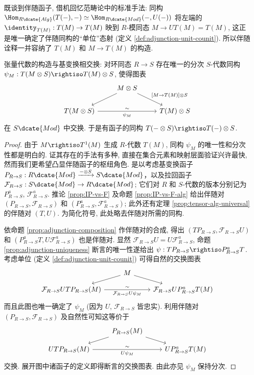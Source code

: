 既谈到伴随函子, 借机回忆范畴论中的标准手法: 同构 $\Hom_{R\dcate{Alg}}(T(-), -) \simeq \Hom_{R\dcate{Mod}}(-, U(-))$ 将左端的 $\identity_{T(M)}: T(M) \to T(M)$ 映到 $R$-模同态 $M \to UT(M) = T(M)$, 这正是唯一确定了伴随同构的``单位''态射 (定义 \ref{def:adjunction-unit-counit}). 所以伴随诠释一并容纳了 $T(M)$ 和 $M \to T(M)$ 的构造.

\begin{lemma}\label{prop:tensor-alg-basechange}
	张量代数的构造与基变换相交换: 对环同态 $R \to S$ 存在唯一的分次 $S$-代数同构 $\psi_M: T(M \otimes S) \rightiso T(M) \otimes S$, 使得图表
	\[\begin{tikzcd}
		& M \otimes S \arrow[ld] \arrow[rd, "{[M \to T(M)] \otimes S}"] & \\
		T(M \otimes S) \arrow[rr, "\sim", "\psi_M"'] & & T(M) \otimes S
	\end{tikzcd}\]
	在 $S\dcate{Mod}$ 中交换. 于是有函子的同构 $T(- \otimes S) \rightiso T(-) \otimes S$.
\end{lemma}
\begin{proof}
	由于 $M \rightiso T^1(M)$ 生成 $R$-代数 $T(M)$, 同构 $\psi_M$ 的唯一性和分次性都是明白的. 证其存在的手法有多种, 直接在集合元素和映射层面验证兴许最快, 然而我们更希望凸显伴随函子的枢纽角色. 是以考虑基变换函子 $P_{R \to S}: R\dcate{Mod} \xrightarrow{- \otimes S} S\dcate{Mod}$，以及拉回函子 $\mathcal{F}_{R \to S}: S\dcate{Mod} \to R\dcate{Mod}$; 它们对 $R$ 和 $S$-代数的版本分别记为 $P_{R \to S}^a$, $\mathcal{F}^a_{R \to S}$. 推论 \ref{prop:IP-vs-F} 及命题 \ref{prop:IP-vs-F-alg} 给出伴随对 $(P_{R \to S}, \mathcal{F}_{R \to S})$ 和 $(P_{R \to S}^a, \mathcal{F}_{R \to S}^a)$; 此外还有定理 \ref{prop:tensor-alg-universal}的伴随对 $(T, U)$. 为简化符号, 此处略去伴随对所需的同构.

	依命题 \ref{prop:adjunction-composition} 作伴随对的合成, 得出 $(T P_{R \to S}, \mathcal{F}_{R \to S} U)$ 和 $(P_{R \to S}^a T, U \mathcal{F}_{R \to S}^a)$ 也是伴随对. 显然 $\mathcal{F}_{R \to S} U = U \mathcal{F}_{R \to S}^a$, 命题 \ref{prop:adjunction-uniqueness} 断言的唯一性遂给出 $\psi: TP_{R \to S} \rightiso P_{R \to S}^a T$. 考虑单位 (定义 \ref{def:adjunction-unit-counit}) 可得自然的交换图表
	\[\begin{tikzcd}[row sep=small]
		{} & M \arrow[ld] \arrow[rd] & \\
		\mathcal{F}_{R \to S} U T P_{R \to S} (M) \arrow[rr, "\sim", "{\mathcal{F}_{R \to S}U \psi_M}"'] & & \mathcal{F}_{R \to S} U P_{R \to S}^a T(M)
	\end{tikzcd}\]
	而且此图也唯一确定了 $\psi_M$ (因为 $U$, $\mathcal{F}_{R \to S}$ 皆忠实). 利用伴随对 $(P_{R \to S}, \mathcal{F}_{R \to S})$ 及自然性可知这等价于
	\[\begin{tikzcd}[row sep=small]
		{} & P_{R \to S}(M) \arrow[ld] \arrow[rd] & \\
		U T P_{R \to S} (M) \arrow[rr, "\sim", "{U \psi_M}"'] & & U P_{R \to S}^a T(M)
	\end{tikzcd}\]
	交换. 展开图中诸函子的定义即得断言的交换图表. 由此亦见 $\psi_M$ 保持分次.
\end{proof}

